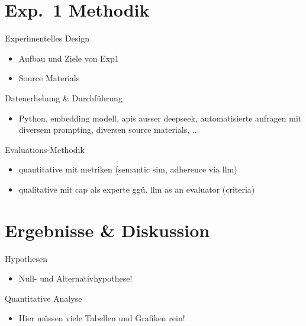 \documentclass[usenames, dvipsnames, aspectratio=32]{beamer}
\begin{document}
\section{Exp.\ 1 Methodik}

\begin{frame}{Experimentelles Design}
    \begin{itemize}
        \item Aufbau und Ziele von Exp1
        \item Source Materials
    \end{itemize}
\end{frame}

\begin{frame}{Datenerhebung \& Durchführung}
    \begin{itemize}
        \item Python, embedding modell, apis ausser deepseek, automatisierte anfragen mit diversem prompting, diversen source materials, ...
    \end{itemize}
\end{frame}

\begin{frame}{Evaluations-Methodik}
    \begin{itemize}
        \item quantitative mit metriken (semantic sim, adherence via llm)
        \item qualitative mit cap als experte ggü. llm as an evaluator (criteria) 
    \end{itemize}
\end{frame}

\section{Ergebnisse \& Diskussion}

\begin{frame}{Hypothesen}
    \begin{itemize}
        \item Null- und Alternativhypothese! %
    \end{itemize}
\end{frame}

\begin{frame}{Quantitative Analyse}
    \begin{itemize}
        \item Hier müssen viele Tabellen und Grafiken rein!
    \end{itemize}
\end{frame}
\end{document}
